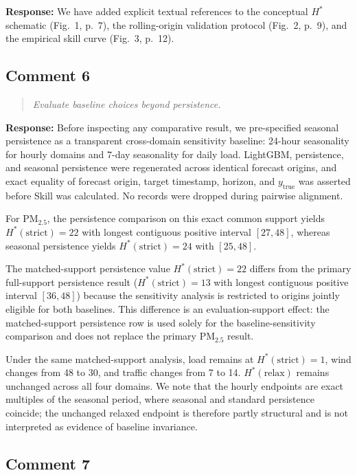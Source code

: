 \documentclass[11pt,a4paper]{article}
\newenvironment{reviewcomment}
  {\begin{quote}\itshape}
  {\end{quote}}
\newcommand{\response}{\noindent\textbf{Response:} }
\begin{document}
\response
We have added explicit textual references to the conceptual $H^*$ schematic
(Fig.~1, p.~7), the rolling-origin validation protocol (Fig.~2, p.~9), and the
empirical skill curve (Fig.~3, p.~12).


\subsection*{Comment 6}

\begin{reviewcomment}
Evaluate baseline choices beyond persistence.
\end{reviewcomment}

\response
Before inspecting any comparative result, we pre-specified seasonal persistence
as a transparent cross-domain sensitivity baseline: 24-hour seasonality for
hourly domains and 7-day seasonality for daily load. LightGBM, persistence, and
seasonal persistence were regenerated across identical forecast origins, and
exact equality of forecast origin, target timestamp, horizon, and
$y_{\mathrm{true}}$ was asserted before Skill was calculated. No records were
dropped during pairwise alignment.

For PM$_{2.5}$, the persistence comparison on this exact common support yields
$H^*(\mathrm{strict})=22$ with longest contiguous positive interval $[27,48]$,
whereas seasonal persistence yields $H^*(\mathrm{strict})=24$ with $[25,48]$.

The matched-support persistence value $H^*(\mathrm{strict})=22$ differs from
the primary full-support persistence result ($H^*(\mathrm{strict})=13$ with
longest contiguous positive interval $[36,48]$) because the sensitivity
analysis is restricted to origins jointly eligible for both baselines. This
difference is an evaluation-support effect: the matched-support persistence row
is used solely for the baseline-sensitivity comparison and does not replace the
primary PM$_{2.5}$ result.

Under the same matched-support analysis, load remains at
$H^*(\mathrm{strict})=1$, wind changes from 48 to 30, and traffic changes from
7 to 14. $H^*(\mathrm{relax})$ remains unchanged across all four domains. We
note that the hourly endpoints are exact multiples of the seasonal period,
where seasonal and standard persistence coincide; the unchanged relaxed
endpoint is therefore partly structural and is not interpreted as evidence of
baseline invariance.


\subsection*{Comment 7}
\end{document}
